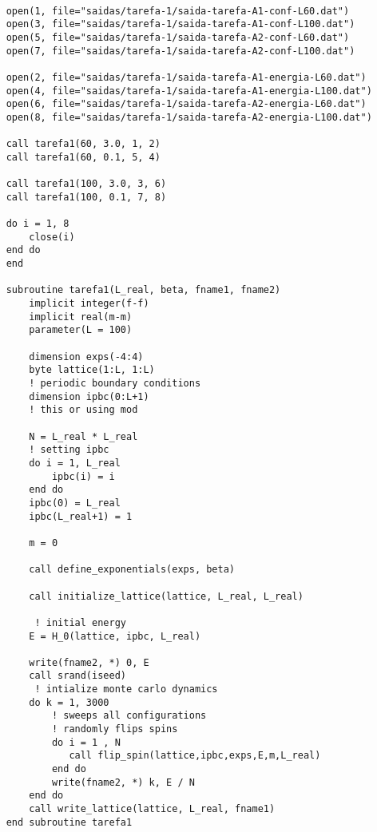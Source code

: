 \begin{verbatim}

    open(1, file="saidas/tarefa-1/saida-tarefa-A1-conf-L60.dat")
    open(3, file="saidas/tarefa-1/saida-tarefa-A1-conf-L100.dat")
    open(5, file="saidas/tarefa-1/saida-tarefa-A2-conf-L60.dat")
    open(7, file="saidas/tarefa-1/saida-tarefa-A2-conf-L100.dat")

    open(2, file="saidas/tarefa-1/saida-tarefa-A1-energia-L60.dat")
    open(4, file="saidas/tarefa-1/saida-tarefa-A1-energia-L100.dat")
    open(6, file="saidas/tarefa-1/saida-tarefa-A2-energia-L60.dat")
    open(8, file="saidas/tarefa-1/saida-tarefa-A2-energia-L100.dat")
    
    call tarefa1(60, 3.0, 1, 2)
    call tarefa1(60, 0.1, 5, 4)

    call tarefa1(100, 3.0, 3, 6)
    call tarefa1(100, 0.1, 7, 8)

    do i = 1, 8
        close(i)    
    end do
    end

    subroutine tarefa1(L_real, beta, fname1, fname2)
        implicit integer(f-f)
        implicit real(m-m)
        parameter(L = 100)

        dimension exps(-4:4)
        byte lattice(1:L, 1:L)
        ! periodic boundary conditions
        dimension ipbc(0:L+1)
        ! this or using mod

        N = L_real * L_real
        ! setting ipbc
        do i = 1, L_real
            ipbc(i) = i
        end do  
        ipbc(0) = L_real
        ipbc(L_real+1) = 1

        m = 0

        call define_exponentials(exps, beta)

        call initialize_lattice(lattice, L_real, L_real)

         ! initial energy
        E = H_0(lattice, ipbc, L_real)

        write(fname2, *) 0, E
        call srand(iseed)
         ! intialize monte carlo dynamics
        do k = 1, 3000
            ! sweeps all configurations
            ! randomly flips spins
            do i = 1 , N
               call flip_spin(lattice,ipbc,exps,E,m,L_real)
            end do  
            write(fname2, *) k, E / N
        end do  
        call write_lattice(lattice, L_real, fname1) 
    end subroutine tarefa1
\end{verbatim}